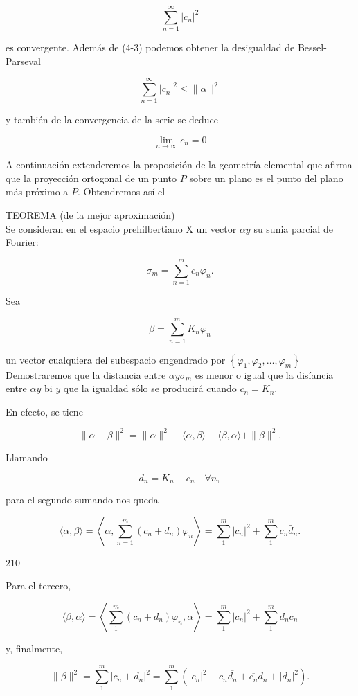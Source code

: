 \documentclass[10pt]{article}
\theoremstyle{plain}
\theoremstyle{definition}
\theoremstyle{remark}
\begin{document}
$$
\sum_{n=1}^{\infty}\left|c_{n}\right|^{2}
$$

es convergente. Además de (4-3) podemos obtener la desigualdad de Bessel-Parseval

$$
\sum_{n=1}^{\infty}\left|c_{n}\right|^{2} \leqslant\|\alpha\|^{2}
$$

y también de la convergencia de la serie se deduce

$$
\lim _{n \rightarrow \infty} c_{n}=0
$$

A continuación extenderemos la proposición de la geometría elemental que afirma que la proyección ortogonal de un punto $P$ sobre un plano es el punto del plano más próximo a $P$. Obtendremos así el

TEOREMA (de la mejor aproximación)\\
Se consideran en el espacio prehilbertiano X un vector $\alpha y$ su sunia parcial de Fourier:

$$
\sigma_{m}=\sum_{n=1}^{m} c_{n} \varphi_{n} .
$$

Sea

$$
\beta=\sum_{n=1}^{m} K_{n} \varphi_{n}
$$

un vector cualquiera del subespacio engendrado por $\left\{\varphi_{1}, \varphi_{2}, \ldots, \varphi_{m}\right\}$\\
Demostraremos que la distancia entre $\alpha y \sigma_{m}$ es menor o igual que la disíancia entre $\alpha y$ bi $y$ que la igualdad sólo se producirá cuando $c_{n}=K_{n}$.

En efecto, se tiene

$$
\|\alpha-\beta\|^{2}=\|\alpha\|^{2}-\langle\alpha, \beta\rangle-\langle\beta, \alpha\rangle+\|\beta\|^{2} .
$$

Llamando

$$
d_{n}=K_{n}-c_{n} \quad \forall n,
$$

para el segundo sumando nos queda

$$
\langle\alpha, \beta\rangle=\left\langle\alpha, \sum_{n=1}^{m}\left(c_{n}+d_{n}\right) \varphi_{n}\right\rangle=\sum_{1}^{m}\left|c_{n}\right|^{2}+\sum_{1}^{m} c_{n} \bar{d}_{n} .
$$

210

Para el tercero,

$$
\langle\beta, \alpha\rangle=\left\langle\sum_{1}^{m}\left(c_{n}+d_{n}\right) \varphi_{n}, \alpha\right\rangle=\sum_{1}^{m}\left|c_{n}\right|^{2}+\sum_{1}^{m} d_{n} \bar{c}_{n}
$$

y, finalmente,

$$
\|\beta\|^{2}=\sum_{1}^{m}\left|c_{n}+d_{n}\right|^{2}=\sum_{1}^{m}\left(\left|c_{n}\right|^{2}+c_{n} \overline{d_{n}}+\overline{c_{n}} d_{n}+\left|d_{n}\right|^{2}\right) .
$$
\end{document}
